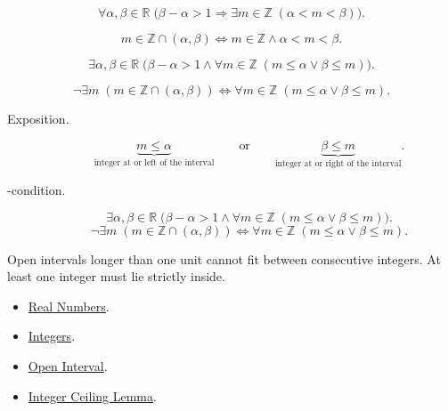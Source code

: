 \begin{remark*}
\[
\forall \alpha,\beta\in\mathbb{R}\;
\bigl(\beta-\alpha>1\Longrightarrow
\exists m\in\mathbb{Z}\;(\alpha<m<\beta)\bigr).
\]
\end{remark*}

\begin{remark*}
\[
m\in\mathbb{Z}\cap(\alpha,\beta)
\Longleftrightarrow
m\in\mathbb{Z}\land \alpha<m<\beta.
\]
\end{remark*}

\begin{remark*}
\[
\exists \alpha,\beta\in\mathbb{R}\;
\bigl(\beta-\alpha>1\land
\forall m\in\mathbb{Z}\;(m\le \alpha\lor \beta\le m)\bigr).
\]
\end{remark*}

\begin{remark*}
\[
\neg\exists m\;(m\in\mathbb{Z}\cap(\alpha,\beta))
\Longleftrightarrow
\forall m\in\mathbb{Z}\;(m\le \alpha\lor \beta\le m).
\]
\end{remark*}

\begin{remark*}
\begin{description}
  \item[Exposition.]
\[
\underbrace{m\le \alpha}_{\text{integer at or left of the interval}}
\qquad\text{or}\qquad
\underbrace{\beta\le m}_{\text{integer at or right of the interval}}.
\]


  \item[\exists-condition.]
  \[
\exists \alpha,\beta\in\mathbb{R}\;
\bigl(\beta-\alpha>1\land
\forall m\in\mathbb{Z}\;(m\le \alpha\lor \beta\le m)\bigr).
\]
\[
\neg\exists m\;(m\in\mathbb{Z}\cap(\alpha,\beta))
\Longleftrightarrow
\forall m\in\mathbb{Z}\;(m\le \alpha\lor \beta\le m).
\]
\end{description}
\end{remark*}

\begin{remark*}[Interpretation]
Open intervals longer than one unit cannot fit between consecutive integers.
At least one integer must lie strictly inside.
\end{remark*}

\begin{dependencies}
\begin{itemize}
\item \hyperref[def:reals]{Real Numbers}.
\item \hyperref[def:integers]{Integers}.
\item \hyperref[def:open-interval]{Open Interval}.
\item \hyperref[lem:integer-ceiling-lemma]{Integer Ceiling Lemma}.
\end{itemize}
\end{dependencies}
